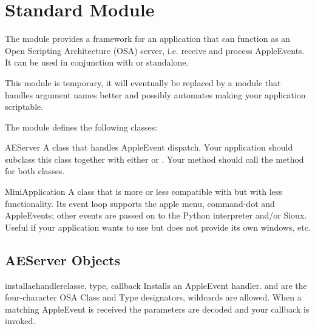 \section{Standard Module }



The module  provides a framework for an application
that can function as an Open Scripting Architecture
(OSA) server, i.e. receive and process
AppleEvents. It can be used in conjunction with
 or standalone.

This module is temporary, it will eventually be replaced by a module
that handles argument names better and possibly automates making your
application scriptable.

The  module defines the following classes:


\begin{classdesc}{AEServer}{}
A class that handles AppleEvent dispatch. Your application should
subclass this class together with either
 or
. Your  method should
call the  method for both classes.
\end{classdesc}

\begin{classdesc}{MiniApplication}{}
A class that is more or less compatible with
 but with less functionality. Its
event loop supports the apple menu, command-dot and AppleEvents; other
events are passed on to the Python interpreter and/or Sioux.
Useful if your application wants to use  but does not
provide its own windows, etc.
\end{classdesc}


\subsection{AEServer Objects}
\label{aeserver-objects}

\begin{methoddesc}[AEServer]{installaehandler}{classe, type, callback}
Installs an AppleEvent handler.  and  are the
four-character OSA Class and Type designators,  wildcards
are allowed. When a matching AppleEvent is received the parameters are
decoded and your callback is invoked.
\end{methoddesc}

